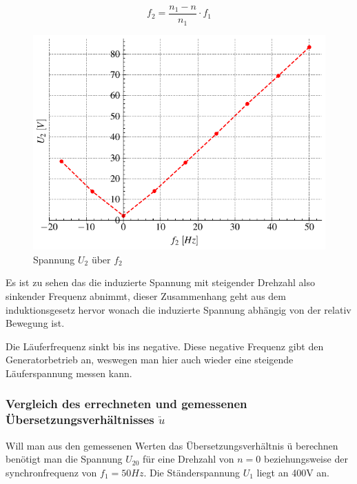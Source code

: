 \documentclass[conference]{IEEEtran}
\begin{document}
\begin{equation}
    f_2 = \dfrac{n_1 - n}{n_1}  \cdot f_1
\end{equation}



\begin{figure}[htbp]
    \centering
    \includegraphics[width=\columnwidth]{./figures/U2_ueber-f2_vergleichen.pdf}
    \caption{Spannung $U_2$ über $f_2$}
    \label{fig:U2_ueber-f2_vergleichen}
\end{figure}

Es ist zu sehen das die induzierte Spannung mit steigender Drehzahl also
sinkender Frequenz abnimmt, dieser Zusammenhang geht aus dem induktionsgesetz
hervor wonach die induzierte Spannung abhängig von der relativ Bewegung ist.

Die Läuferfrequenz sinkt bis ins negative. Diese negative Frequenz gibt den
Generatorbetrieb an, weswegen man hier auch wieder eine steigende
Läuferspannung messen kann.

\vspace{5mm}
\subsubsection{ Vergleich des errechneten und gemessenen
Übersetzungsverhältnisses $ \ddot{u} $}

Will man aus den gemessenen Werten das Übersetzungsverhältnis ü berechnen
benötigt man die Spannung $U_{20}$ für eine Drehzahl von $ n = 0 $
beziehungsweise der synchronfrequenz von $ f_{1} = 50Hz $. Die Ständerspannung
$ U_{1} $ liegt an 400V an.
\end{document}
